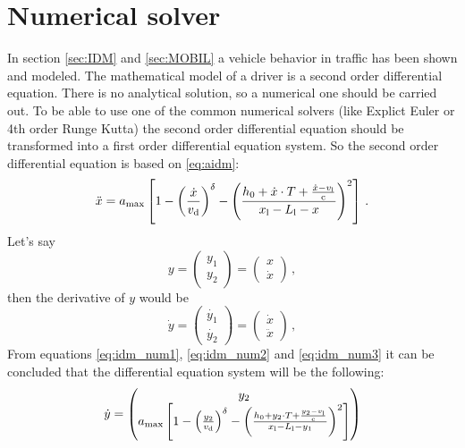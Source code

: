 		\section{Numerical solver}
			In section \ref{sec:IDM} and \ref{sec:MOBIL} a vehicle behavior in traffic has been shown and modeled. The mathematical model of a driver is a second order differential equation. There is no analytical solution, so a numerical one should be carried out. To be able to use one of the common numerical solvers (like Explict Euler or 4th order Runge Kutta) the second order differential equation should be transformed into a first order differential equation system. So the second order differential equation is based on \ref{eq:aidm}:
			\begin{equation}
				\ddot{x}=a_{\rm max}\left [ 1 - \left ( \frac{\dot{x}}{v_{\rm d}} \right )^\delta - \left ( \frac{h_0 + \dot{x}\cdot T + \frac{\dot{x}-v_{\rm l}}{{\rm c}}}{x_{\rm l}-L_{\rm l} - x} \right )^2 \right ]\,.
				\label{eq:idm_num1}
			\end{equation}
			Let's say
			\begin{equation}
				y=
				\begin{pmatrix}
					y_1\\
					y_2
				\end{pmatrix}
				=
				\begin{pmatrix}
					x\\
					\dot{x}
				\end{pmatrix}\,,
				\label{eq:idm_num2}
			\end{equation}
			then the derivative of $y$ would be
			\begin{equation}
				\dot{y}=
				\begin{pmatrix}
					\dot{y_1}\\
					\dot{y_2}
				\end{pmatrix}
				=
				\begin{pmatrix}
					\dot{x}\\
					\ddot{x}
				\end{pmatrix}\,,
				\label{eq:idm_num3}
			\end{equation}
			From equations \ref{eq:idm_num1}, \ref{eq:idm_num2} and \ref{eq:idm_num3} it can be concluded that the differential equation system will be the following:
			\begin{equation}
				\dot{y}=
				\begin{pmatrix}
					y_2\\
					a_{\rm max}\left [ 1 - \left ( \frac{y_2}{v_{\rm d}} \right )^{\rm \delta} - \left ( \frac{h_0 + y_2\cdot T + \frac{y_2-v_{\rm l}}{{\rm c}}}{x_{\rm l}-L_{\rm l} - y_1} \right )^2 \right ]
				\end{pmatrix}
				\label{eq:numerical_idm}
			\end{equation}